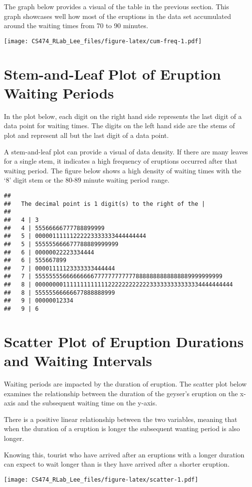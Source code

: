 \documentclass[
]{article}
\begin{document}
The graph below provides a visual of the table in the previous section.
This graph showcases well how most of the eruptions in the data set
accumulated around the waiting times from 70 to 90 minutes.

\texttt{[image: CS474\_RLab\_Lee\_files/figure-latex/cum-freq-1.pdf]}

\hypertarget{stem-and-leaf-plot-of-eruption-waiting-periods}{%
\section{Stem-and-Leaf Plot of Eruption Waiting
Periods}\label{stem-and-leaf-plot-of-eruption-waiting-periods}}

In the plot below, each digit on the right hand side represents the last
digit of a data point for waiting times. The digits on the left hand
side are the stems of plot and represent all but the last digit of a
data point.

A stem-and-leaf plot can provide a visual of data density. If there are
many leaves for a single stem, it indicates a high frequency of
eruptions occurred after that waiting period. The figure below shows a
high density of waiting times with the `8' digit stem or the 80-89
minute waiting period range.

\begin{verbatim}
## 
##   The decimal point is 1 digit(s) to the right of the |
## 
##   4 | 3
##   4 | 55566666777788899999
##   5 | 00000111111222223333333444444444
##   5 | 555555666677788889999999
##   6 | 00000022223334444
##   6 | 555667899
##   7 | 00001111123333333444444
##   7 | 555555556666666667777777777778888888888888889999999999
##   8 | 000000001111111111111222222222222333333333333334444444444
##   8 | 55555566666677888888999
##   9 | 00000012334
##   9 | 6
\end{verbatim}

\hypertarget{scatter-plot-of-eruption-durations-and-waiting-intervals}{%
\section{Scatter Plot of Eruption Durations and Waiting
Intervals}\label{scatter-plot-of-eruption-durations-and-waiting-intervals}}

Waiting periods are impacted by the duration of eruption. The scatter
plot below examines the relationship between the duration of the
geyser's eruption on the x-axis and the subsequent waiting time on the
y-axis.

There is a positive linear relationship between the two variables,
meaning that when the duration of a eruption is longer the subsequent
wanting period is also longer.

Knowing this, tourist who have arrived after an eruptions with a longer
duration can expect to wait longer than is they have arrived after a
shorter eruption.

\texttt{[image: CS474\_RLab\_Lee\_files/figure-latex/scatter-1.pdf]}
\end{document}

